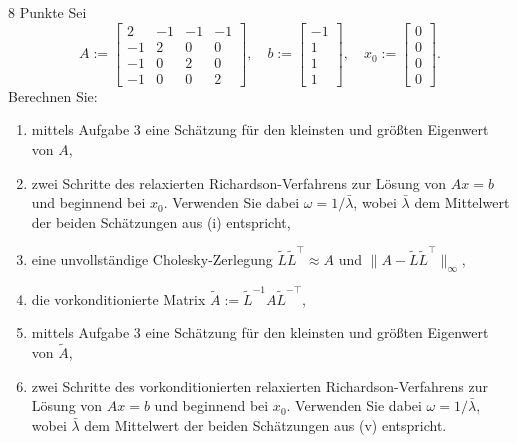 \documentclass{problemset}
\begin{document}
\begin{problem}{8 Punkte}
Sei
\[
    A :=
    \begin{bmatrix}
        2  & -1 & -1 & -1 \\
        -1 & 2  & 0  & 0  \\
        -1 & 0  & 2  & 0  \\
        -1 & 0  & 0  & 2
    \end{bmatrix}, \quad
    b :=
    \begin{bmatrix}
        -1 \\ 1 \\ 1 \\ 1
    \end{bmatrix}, \quad
    x_0 :=
    \begin{bmatrix}
        0 \\ 0 \\ 0 \\ 0
    \end{bmatrix}.
\]
Berechnen Sie:
\begin{enumerate}
    \item mittels Aufgabe 3 eine Schätzung für den kleinsten und größten
          Eigenwert von \( A \),
    \item zwei Schritte des relaxierten Richardson-Verfahrens zur Lösung von \(
          Ax = b \) und beginnend bei \( x_0 \). Verwenden Sie dabei \( \omega
          = 1 / \bar{\lambda} \), wobei \( \bar{\lambda} \) dem Mittelwert der
          beiden Schätzungen aus (i) entspricht,
    \item eine unvollständige Cholesky-Zerlegung \( \tilde{L} \tilde{L}^\top
          \approx A \) und \( \|A - \tilde{L} \tilde{L}^\top \|_\infty \),
    \item die vorkonditionierte Matrix \( \tilde{A} := \tilde{L}^{-1} A
          \tilde{L}^{-\top} \),
    \item mittels Aufgabe 3 eine Schätzung für den kleinsten und größten
          Eigenwert von \( \tilde{A} \),
    \item zwei Schritte des vorkonditionierten relaxierten
          Richardson-Verfahrens zur Lösung von \( Ax = b \) und beginnend bei
          \( x_0 \). Verwenden Sie dabei \( \omega = 1 / \bar{\lambda} \),
          wobei \( \bar{\lambda} \) dem Mittelwert der beiden Schätzungen aus
          (v) entspricht.
\end{enumerate}
\end{problem}
\end{document}
